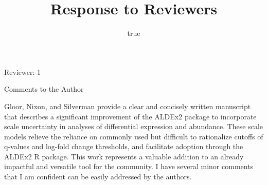 \documentclass[
]{article}
\title{Response to Reviewers}
\author{true}
\date{}
\begin{document}
\maketitle

Reviewer: 1

Comments to the Author

Gloor, Nixon, and Silverman provide a clear and concisely written
manuscript that describes a significant improvement of the ALDEx2
package to incorporate scale uncertainty in analyses of differential
expression and abundance. These scale models relieve the reliance on
commonly used but difficult to rationalize cutoffs of q-values and
log-fold change thresholds, and facilitate adoption through the ALDEx2 R
package. This work represents a valuable addition to an already
impactful and versatile tool for the community. I have several minor
comments that I am confident can be easily addressed by the authors.
\end{document}
